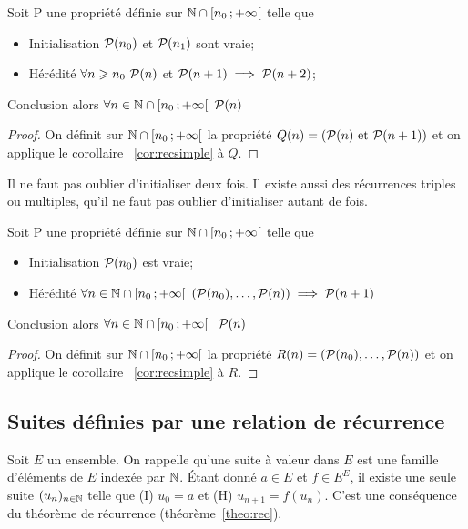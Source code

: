 \begin{cor}
  \label{cor:recdouble}
  Soit P une propriété définie sur \(\N\cap \intervallefo{n_0}{+\infty}\) telle 
  que
  \begin{itemize}
    \item Initialisation \(\P(n_0)\) et \(\P(n_1)\) sont vraie;
    \item Hérédité \(\forall n\geqslant n_0 \ \P(n)\) et \(\P(n + 1) \implies 
      \P(n + 2)\);
  \end{itemize}
Conclusion alors \(\forall n \in \N\cap \intervallefo{n_0}{+\infty} \ \P(n)\) 
\end{cor}

\begin{proof}
  On définit sur \(\N\cap \intervallefo{n_0}{+\infty}\) la propriété 
  \(Q(n) = (\P(n) \text{~et~} \P(n + 1))\) et on applique le corollaire~
  \ref{cor:recsimple} à \(Q\).
\end{proof}

Il ne faut pas oublier d'initialiser deux fois. Il existe aussi des récurrences 
triples ou multiples, qu'il ne faut pas oublier d'initialiser autant de fois.

\begin{cor}
  \label{cor:recforte}
  Soit P une propriété définie sur \(\N\cap \intervallefo{n_0}{+\infty}\) telle 
  que
  \begin{itemize}
    \item Initialisation \(\P(n_0)\) est vraie;
    \item Hérédité \(\forall n \in \N\cap \intervallefo{n_0}{+\infty} \ 
      (\P(n_0), \ldots, \P(n)) \implies \P(n + 1)\)
  \end{itemize}
  Conclusion alors \(\forall n \in \N\cap \intervallefo{n_0}{+\infty}\ \ \P(n)\)
\end{cor}

\begin{proof}
  On définit sur \(\N\cap \intervallefo{n_0}{+\infty}\) la propriété 
  \(R(n) = (\P(n_0), \ldots, \P(n))\) et on applique le corollaire~
  \ref{cor:recsimple} à \(R\).
\end{proof}

\subsection{Suites définies par une relation de récurrence}

Soit \(E\) un ensemble. On rappelle qu'une suite à valeur dans \(E\) est une 
famille d'éléments de \(E\) indexée par \(\N\). Étant donné \(a\in E\) et \(f\in 
E^E\), il existe une seule suite \((u_n)_{n\in\N}\) telle que (I) \(u_0 = a\) et 
(H) \(u_{n + 1} = f(u_n)\). C'est une conséquence du théorème de récurrence 
(théorème~\ref{theo:rec}).

